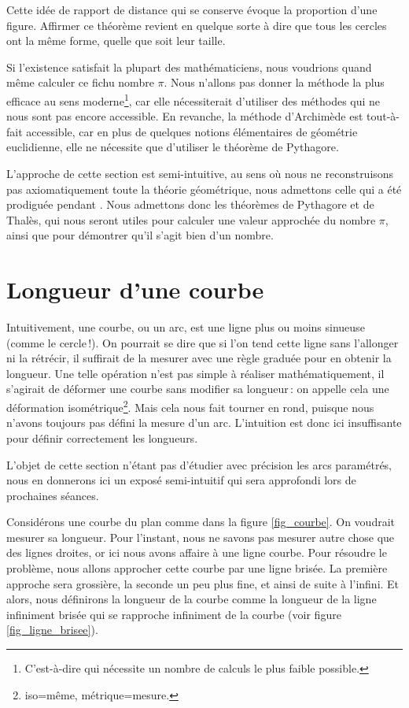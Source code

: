 	Cette idée de rapport de distance qui se conserve évoque la proportion d'une figure. Affirmer ce théorème revient en quelque sorte à dire que tous les cercles ont la même forme, quelle que soit leur taille.

	Si l'existence satisfait la plupart des mathématiciens, nous voudrions quand même calculer ce fichu nombre $\pi$. Nous n'allons pas donner la méthode la plus efficace au sens moderne\footnote{C'est-à-dire qui nécessite un nombre de calculs le plus faible possible.}, car elle nécessiterait d'utiliser des méthodes qui ne nous sont pas encore accessible. En revanche, la méthode d'Archimède est tout-à-fait accessible, car en plus de quelques notions élémentaires de géométrie euclidienne, elle ne nécessite que d'utiliser le théorème de Pythagore.

	L'approche de cette section est semi-intuitive, au sens où nous ne reconstruisons pas axiomatiquement toute la théorie géométrique, nous admettons celle qui a été prodiguée pendant . Nous admettons donc les théorèmes de Pythagore et de Thalès, qui nous seront utiles pour calculer une valeur approchée du nombre $\pi$, ainsi que pour démontrer qu'il s'agit bien d'un nombre. 

\section{Longueur d'une courbe}
	Intuitivement, une courbe, ou un arc, est une ligne plus ou moins sinueuse (comme le cercle\,!). On pourrait se dire que si l'on tend cette ligne sans l'allonger ni la rétrécir, il suffirait de la mesurer avec une règle graduée pour en obtenir la longueur. Une telle opération n'est pas simple à réaliser mathématiquement, il s'agirait de déformer une courbe sans modifier sa longueur\,: on appelle cela une déformation isométrique\footnote{iso=même, métrique=mesure.}. Mais cela nous fait tourner en rond, puisque nous n'avons toujours pas défini la mesure d'un arc. L'intuition est donc ici insuffisante pour définir correctement les longueurs.

	L'objet de cette section n'étant pas d'étudier avec précision les arcs paramétrés, nous en donnerons ici un exposé semi-intuitif qui sera approfondi lors de prochaines séances.

	Considérons une courbe du plan comme dans la figure \ref{fig_courbe}. On voudrait mesurer sa longueur. Pour l'instant, nous ne savons pas mesurer autre chose que des lignes droites, or ici nous avons affaire à une ligne courbe. Pour résoudre le problème, nous allons approcher cette courbe par une ligne brisée. La première approche sera grossière, la seconde un peu plus fine, et ainsi de suite à l'infini. Et alors, nous définirons la longueur de la courbe comme la longueur de la ligne infiniment brisée qui se rapproche infiniment de la courbe (voir figure \ref{fig_ligne_brisee}).

